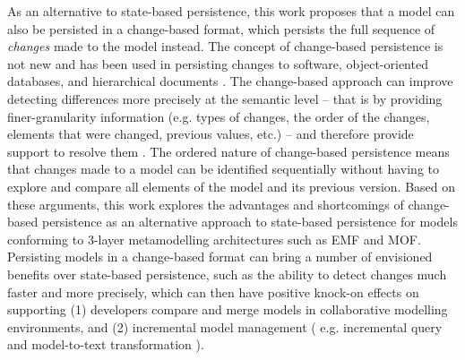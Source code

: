 \documentclass[12pt, a4paper]{report} \usepackage[titletoc]{appendix}
\begin{document}
As an alternative to state-based persistence, this work proposes that a model can also be persisted in a change-based format, which persists the full sequence of \emph{changes} made to the model instead. The concept of change-based persistence is not new and has been used in persisting changes to software, object-oriented databases, and hierarchical documents \cite{DBLP:journals/entcs/RobbesL07,DBLP:conf/sde/LippeO92,DBLP:conf/caise/IgnatN05}. The change-based approach can improve detecting differences more precisely at the semantic level -- that is by providing finer-granularity information (e.g. types of changes, the order of the changes, elements that were changed, previous values, etc.) -- and therefore provide support to resolve them \cite{mens2002state}. The ordered nature of change-based persistence means that changes made to a model can be identified sequentially without having to explore and compare all elements of the model and its previous version. Based on these arguments, this work explores the advantages and shortcomings of change-based persistence as an alternative approach to state-based persistence for models conforming to 3-layer metamodelling architectures such as EMF and MOF. Persisting models in a change-based format can bring a number of envisioned benefits over state-based persistence, such as the ability to detect changes much faster and more precisely, which can then have positive knock-on effects on supporting (1) developers compare and merge models in collaborative modelling environments, and (2) incremental model management ( e.g. incremental query \cite{DBLP:conf/ecmdafa/RathHV12} and model-to-text transformation \cite{Ogunyomi2018}). 
\end{document}
